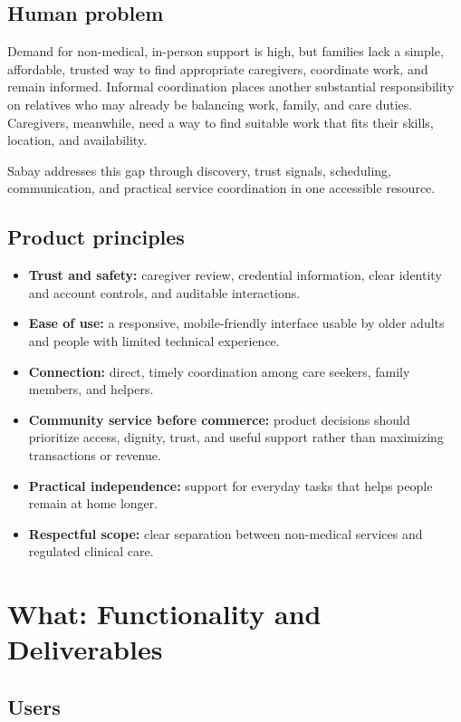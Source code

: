 \documentclass[11pt]{article}
\begin{document}
\subsection{Human problem}

Demand for non-medical, in-person support is high, but families lack a simple, affordable, trusted way to find appropriate caregivers, coordinate work, and remain informed. Informal coordination places another substantial responsibility on relatives who may already be balancing work, family, and care duties. Caregivers, meanwhile, need a way to find suitable work that fits their skills, location, and availability.

Sabay addresses this gap through discovery, trust signals, scheduling, communication, and practical service coordination in one accessible resource.

\subsection{Product principles}

\begin{itemize}
  \item \textbf{Trust and safety:} caregiver review, credential information, clear identity and account controls, and auditable interactions.
  \item \textbf{Ease of use:} a responsive, mobile-friendly interface usable by older adults and people with limited technical experience.
  \item \textbf{Connection:} direct, timely coordination among care seekers, family members, and helpers.
  \item \textbf{Community service before commerce:} product decisions should prioritize access, dignity, trust, and useful support rather than maximizing transactions or revenue.
  \item \textbf{Practical independence:} support for everyday tasks that helps people remain at home longer.
  \item \textbf{Respectful scope:} clear separation between non-medical services and regulated clinical care.
\end{itemize}

\section{What: Functionality and Deliverables}

\subsection{Users}
\end{document}
